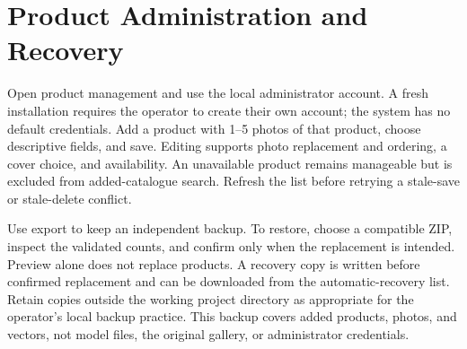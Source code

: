\section{Product Administration and Recovery}
Open product management and use the local administrator account. A fresh
installation requires the operator to create their own account; the system has
no default credentials. Add a product with 1--5 photos of that product, choose
descriptive fields, and save. Editing supports photo replacement and ordering,
a cover choice, and availability. An unavailable product remains manageable
but is excluded from added-catalogue search. Refresh the list before retrying
a stale-save or stale-delete conflict.

Use export to keep an independent backup. To restore, choose a compatible ZIP,
inspect the validated counts, and confirm only when the replacement is intended.
Preview alone does not replace products. A recovery copy is written before
confirmed replacement and can be downloaded from the automatic-recovery list.
Retain copies outside the working project directory as appropriate for the
operator's local backup practice. This backup covers added products, photos,
and vectors, not model files, the original gallery, or administrator credentials.

